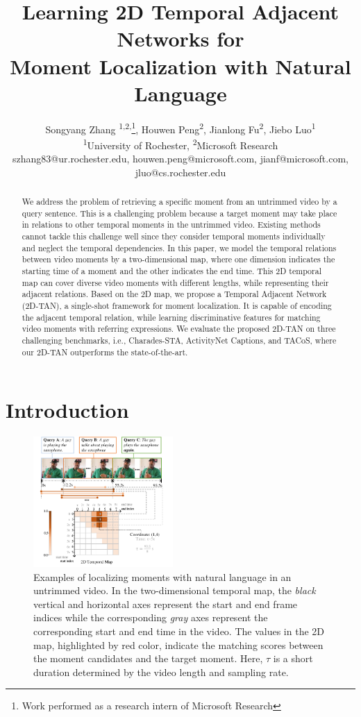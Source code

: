 \documentclass[letterpaper]{article} %
\title{Learning 2D Temporal Adjacent Networks for \\ Moment Localization with Natural Language}
\author{Songyang Zhang \textsuperscript{\rm 1,2,}\thanks{Work performed as a research intern of Microsoft Research},
Houwen Peng\textsuperscript{\rm 2},
Jianlong Fu\textsuperscript{\rm 2},
Jiebo Luo\textsuperscript{\rm 1}\\
\textsuperscript{\rm 1}University of Rochester,
\textsuperscript{\rm 2}Microsoft Research\\
szhang83@ur.rochester.edu,
houwen.peng@microsoft.com,
jianf@microsoft.com,
jluo@cs.rochester.edu
}
\begin{document}
\maketitle

\begin{abstract}

We address the problem of retrieving a specific moment from an untrimmed video by a query sentence. This is a challenging problem because a target moment may take place in relations to other temporal moments in the untrimmed video. Existing methods cannot tackle this challenge well since they consider temporal moments individually and neglect the temporal dependencies. In this paper, we model the temporal relations between video moments by a two-dimensional map, where one dimension indicates the starting time of a moment and the other indicates the end time. This 2D temporal map can cover diverse video moments with different lengths, while representing their adjacent relations. Based on the 2D map, we propose a Temporal Adjacent Network (2D-TAN), a single-shot framework for moment localization. It is capable of encoding the adjacent temporal relation, while learning discriminative features for matching video moments with referring expressions. We evaluate the proposed 2D-TAN on three challenging benchmarks, i.e., Charades-STA, ActivityNet Captions, and TACoS, where our 2D-TAN outperforms the state-of-the-art.

\end{abstract}

\section{Introduction}


\begin{figure}[t!]
\centering
\includegraphics[width=0.475\textwidth]{task.pdf}
\caption{Examples of localizing moments with natural language in an untrimmed video. 
In the two-dimensional temporal map, the \textit{black} vertical and horizontal axes represent the start and end frame indices while the corresponding \textit{gray} axes represent the corresponding start and end time in the video.
The values in the 2D map, highlighted by red color, indicate the matching scores between the moment candidates and the target moment.
Here, $\tau$ is a short duration determined by the video length and sampling rate.
}
\label{fig:task}
\end{figure}
\end{document}
